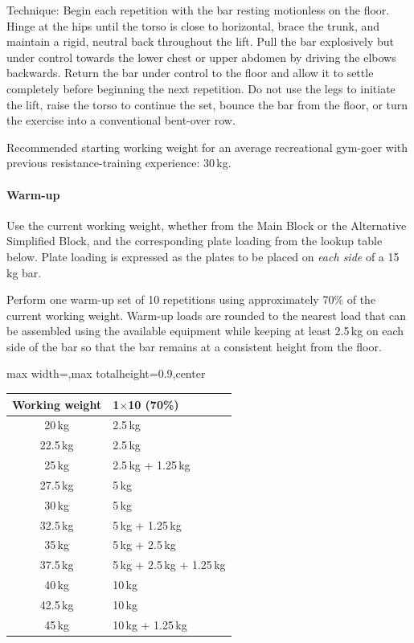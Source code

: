 \documentclass[11pt,a4paper]{article}
\newcommand{\tablearraystretch}{1.15}
\begin{document}
Technique: Begin each repetition with the bar resting motionless on the floor. Hinge at the hips until the torso is close to horizontal, brace the trunk, and maintain a rigid, neutral back throughout the lift. Pull the bar explosively but under control towards the lower chest or upper abdomen by driving the elbows backwards. Return the bar under control to the floor and allow it to settle completely before beginning the next repetition. Do not use the legs to initiate the lift, raise the torso to continue the set, bounce the bar from the floor, or turn the exercise into a conventional bent-over row.

Recommended starting working weight for an average recreational gym-goer with previous resistance-training experience: 30\,kg.

\paragraph{Warm-up}

Use the current working weight, whether from the Main Block or the Alternative Simplified Block, and the corresponding plate loading from the lookup table below. Plate loading is expressed as the plates to be placed on \emph{each side} of a 15\,kg bar.

Perform one warm-up set of 10 repetitions using approximately 70\% of the current working weight. Warm-up loads are rounded to the nearest load that can be assembled using the available equipment while keeping at least 2.5\,kg on each side of the bar so that the bar remains at a consistent height from the floor.

\begin{center}
\renewcommand{\arraystretch}{\tablearraystretch}
\begin{adjustbox}{max width=\linewidth,max totalheight=0.9\textheight,center}
\begin{tabular}{c p{5.5cm}}
\toprule
Working weight & 1$\times$10 (70\%) \\
\midrule
20\,kg   & 2.5\,kg \\
22.5\,kg & 2.5\,kg \\
25\,kg   & 2.5\,kg + 1.25\,kg \\
27.5\,kg & 5\,kg \\
30\,kg   & 5\,kg \\
32.5\,kg & 5\,kg + 1.25\,kg \\
35\,kg   & 5\,kg + 2.5\,kg \\
37.5\,kg & 5\,kg + 2.5\,kg + 1.25\,kg \\
40\,kg   & 10\,kg \\
42.5\,kg & 10\,kg \\
45\,kg   & 10\,kg + 1.25\,kg \\
\bottomrule
\end{tabular}
\end{adjustbox}
\renewcommand{\arraystretch}{1}
\end{center}
\end{document}
